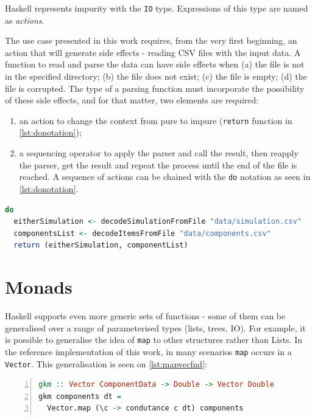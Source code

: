 Haskell represents impurity with the \lstinline!IO! type. Expressions of this type are named as \textit{actions}. 

The use case presented in this work requires, from the very first beginning, an action that will generate side effects - reading CSV files with the input data. A function to read and parse the data can have side effects when (a) the file is not in the specified directory; (b) the file does not exist; (c) the file is empty; (d) the file is corrupted. The type of a parsing function must incorporate the possibility of these side effects, and for that matter, two elements are required:
\begin{enumerate}
  \item an action to change the context from pure to impure (\lstinline!return! function in \cref{lst:donotation});
  \item a sequencing operator to apply the parser and call the result, then reapply the parser, get the result and repeat the process until the end of the file is reached. A sequence of actions can be chained with the \lstinline!do! notation as seen in \cref{lst:donotation}.
\end{enumerate}


\begin{lstlisting}[language=Haskell, caption={do notation; Note: this is just a didactic draft example.}, captionpos=b, label={lst:donotation}]
do
  eitherSimulation <- decodeSimulationFromFile "data/simulation.csv"
  componentsList <- decodeItemsFromFile "data/components.csv"
  return (eitherSimulation, componentList)
\end{lstlisting}


\section{Monads}
\label{hsmonads}

Haskell supports even more generic sets of functions - some of them can be generalised over a range of parameterised types (lists, trees, IO). For example, it is possible to generalise the idea of \lstinline!map! to other structures rather than Lists. In the reference implementation of this work, in many scenarios \lstinline!map! occurs in a \lstinline!Vector!. This generalisation is seen on \cref{lst:mapvecfnd}:

\begin{lstlisting}[language=Haskell, numbers=left, caption={map in a Vector}, captionpos=b, label={lst:mapvecfnd}]
gkm :: Vector ComponentData -> Double -> Vector Double
gkm components dt =
  Vector.map (\c -> condutance c dt) components
\end{lstlisting}

